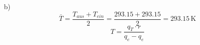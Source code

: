 b)
\[
\bar{T} = \frac{T_{aus} + T_{ein}}{2} = \frac{293.15 + 293.15}{2} = 293.15 \, \text{K}
\]
\[
T = \frac{q_T \cdot r}{q_e - q_e}
\]
